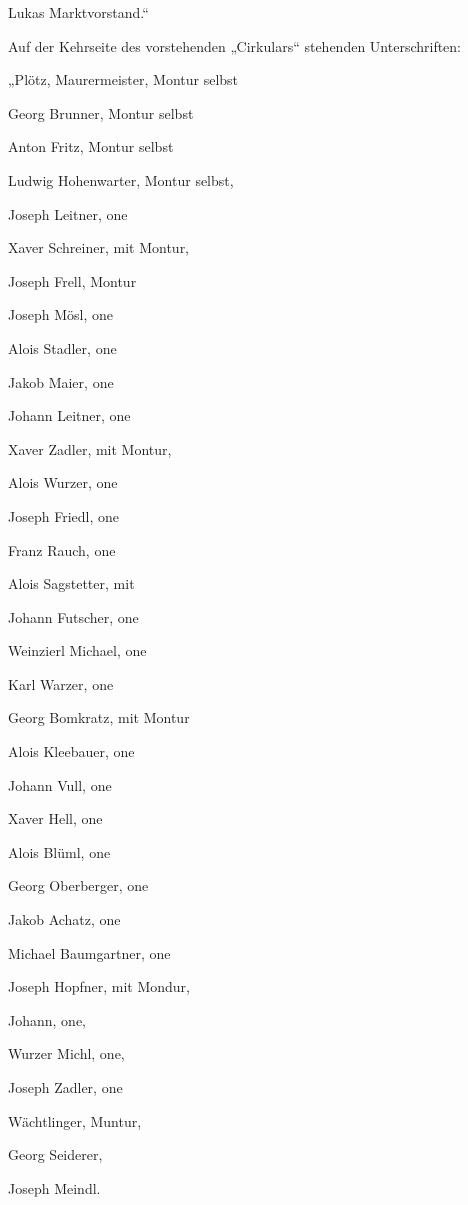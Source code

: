 \documentclass[12pt,a4paper]{book}
\begin{document}
Lukas Marktvorstand.“

Auf der Kehrseite des vorstehenden „Cirkulars“ stehenden Unterschriften:

\begin{compactitem}
\item „Plötz, Maurermeister, Montur selbst
\item Georg Brunner, Montur selbst
\item Anton Fritz, Montur selbst
\item Ludwig Hohenwarter, Montur selbst,
\item Joseph Leitner, one
\item Xaver Schreiner, mit Montur,
\item Joseph Frell, Montur
\item Joseph Mösl, one
\item Alois Stadler, one
\item Jakob Maier, one
\item Johann Leitner, one
\item Xaver Zadler, mit Montur,
\item Alois Wurzer, one
\item Joseph Friedl, one
\item Franz Rauch, one
\item Alois Sagstetter, mit
\item Johann Futscher, one
\item Weinzierl Michael, one
\item Karl Warzer, one
\item Georg Bomkratz, mit Montur
\item Alois Kleebauer, one
\item Johann Vull, one
\item Xaver Hell, one
\item Alois Blüml, one
\item Georg Oberberger, one
\item Jakob Achatz, one
\item Michael Baumgartner, one
\item Joseph Hopfner, mit Mondur,
\item Johann, one,
\item Wurzer Michl, one,
\item Joseph Zadler, one
\item Wächtlinger, Muntur,
\item Georg Seiderer,
\item Joseph Meindl.
\end{compactitem}
\end{document}
